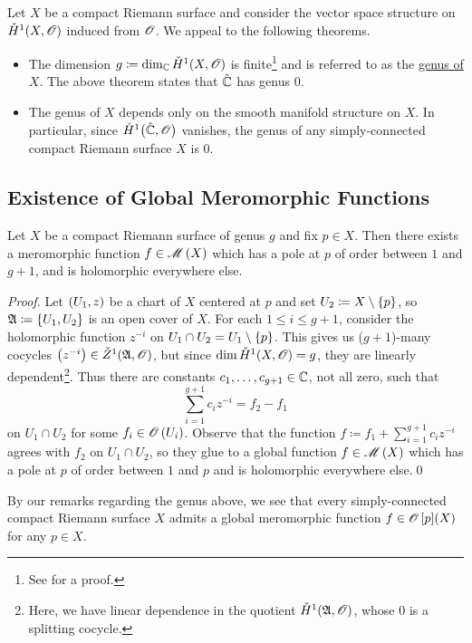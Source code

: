 \documentclass[../Moduli_Spaces_of_Riemann_Surfaces.tex]{subfiles}
\begin{document}
    \begin{remark}
        Let $X$ be a compact Riemann surface and consider the vector space structure on $\check{H}^1\!\left(X,\mathscr{O}\right)$ induced from $\mathscr{O}$. We appeal to the following theorems.
        \begin{itemize}
            \item The dimension $g\coloneqq\dim_{\mathbb{C}}\check{H}^1\!\left(X,\mathscr{O}\right)$ is finite\footnote{See \cite[][Section 14]{forster} for a proof.} and is referred to as the \ul{genus of $X$}. The above theorem states that $\hat{\mathbb{C}}$ has genus $0$.
                \vspace{-0.05in}
            \item The genus of $X$ depends only on the smooth manifold structure on $X$. In particular, since $\check{H}^1\big(\hat{\mathbb{C}},\mathscr{O}\big)$ vanishes, the genus of any simply-connected compact Riemann surface $X$ is $0$.\exqed
        \end{itemize}
    \end{remark}
    \subsection{Existence of Global Meromorphic Functions}
    \begin{theorem}\label{3.3:thm:global_meromorphic_functions}
        Let $X$ be a compact Riemann surface of genus $g$ and fix $p\in X$. Then there exists a meromorphic function $f\in\mathscr{M}\left(X\right)$ which has a pole at $p$ of order between $1$ and $g+1$, and is holomorphic everywhere else.
    \end{theorem}
    \begin{proof}
        Let $\left(U_1,z\right)$ be a chart of $X$ centered at $p$ and set $U_2\coloneqq X\setminus\left\{p\right\}$, so $\mathfrak{A}\coloneqq\left\{U_1,U_2\right\}$ is an open cover of $X$. For each $1\leq i\leq g+1$, consider the holomorphic function $z^{-i}$ on $U_1\cap U_2=U_1\setminus\left\{p\right\}$. This gives us ($g+1$)-many cocycles $\left(z^{-i}\right)\in\check{Z}^1\!\left(\mathfrak{A},\mathscr{O}\right)$, but since $\dim\check{H}^1\!\left(X,\mathscr{O}\right)=g$, they are linearly dependent\footnote{Here, we have linear dependence in the quotient $\check{H}^1\!\left(\mathfrak{A},\mathscr{O}\right)$, whose $0$ is a splitting cocycle.}. Thus there are constants $c_1,\dots,c_{g+1}\in\mathbb{C}$, not all zero, such that
        \begin{equation*}
            \sum_{i=1}^{g+1}c_iz^{-i}=f_2-f_1
        \end{equation*}
        on $U_1\cap U_2$ for some $f_i\in\mathscr{O}\left(U_i\right)$. Observe that the function $f\coloneqq f_1+\sum_{i=1}^{g+1}c_iz^{-i}$ agrees with $f_2$ on $U_1\cap U_2$, so they glue to a global function $f\in\mathscr{M}\left(X\right)$ which has a pole at $p$ of order between $1$ and $p$ and is holomorphic everywhere else.\qed
    \end{proof}
    \begin{remark}
        By our remarks regarding the genus above, we see that every simply-connected compact Riemann surface $X$ admits a global meromorphic function $f\in\mathscr{O}\left[p\right]\!\left(X\right)$ for any $p\in X$.\exqed
    \end{remark}
\end{document}
